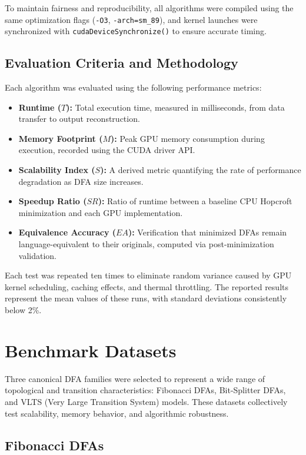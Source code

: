To maintain fairness and reproducibility, all algorithms were compiled using the same optimization flags (\texttt{-O3}, \texttt{-arch=sm\_89}), and kernel launches were synchronized with \texttt{cudaDeviceSynchronize()} to ensure accurate timing.

\subsection{Evaluation Criteria and Methodology}

Each algorithm was evaluated using the following performance metrics:

\begin{itemize}
  \item \textbf{Runtime ($T$):} Total execution time, measured in milliseconds, from data transfer to output reconstruction.
  \item \textbf{Memory Footprint ($M$):} Peak GPU memory consumption during execution, recorded using the CUDA driver API.
  \item \textbf{Scalability Index ($S$):} A derived metric quantifying the rate of performance degradation as DFA size increases.
  \item \textbf{Speedup Ratio ($SR$):} Ratio of runtime between a baseline CPU Hopcroft minimization and each GPU implementation.
  \item \textbf{Equivalence Accuracy ($EA$):} Verification that minimized DFAs remain language-equivalent to their originals, computed via post-minimization validation.
\end{itemize}

Each test was repeated ten times to eliminate random variance caused by GPU kernel scheduling, caching effects, and thermal throttling. The reported results represent the mean values of these runs, with standard deviations consistently below 2\%.

\section{Benchmark Datasets}

Three canonical DFA families were selected to represent a wide range of topological and transition characteristics: Fibonacci DFAs, Bit-Splitter DFAs, and VLTS (Very Large Transition System) models. These datasets collectively test scalability, memory behavior, and algorithmic robustness.

\subsection{Fibonacci DFAs}

